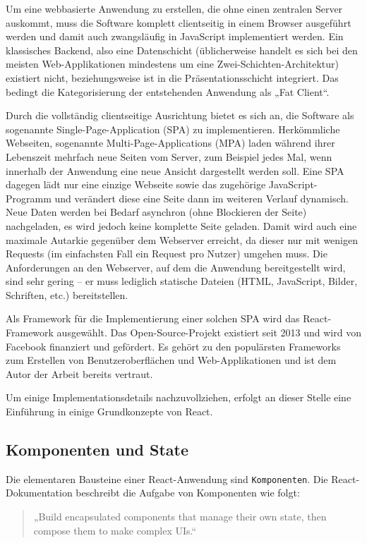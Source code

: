 Um eine webbasierte Anwendung zu erstellen, die ohne einen zentralen Server auskommt, muss die Software komplett clientseitig in einem Browser ausgeführt werden und damit auch zwangsläufig in JavaScript implementiert werden. Ein klassisches Backend, also eine Datenschicht (üblicherweise handelt es sich bei den meisten Web-Applikationen mindestens um eine Zwei-Schichten-Architektur) existiert nicht, beziehungsweise ist in die Präsentationsschicht integriert. Das bedingt die Kategorisierung der entstehenden Anwendung als „Fat Client“.

Durch die vollständig clientseitige Ausrichtung bietet es sich an, die Software als sogenannte Single-Page-Application (SPA) zu implementieren. Herkömmliche Webseiten, sogenannte Multi-Page-Applications (MPA) laden während ihrer Lebenszeit mehrfach neue Seiten vom Server, zum Beispiel jedes Mal, wenn innerhalb der Anwendung eine neue Ansicht dargestellt werden soll. Eine SPA dagegen lädt nur eine einzige Webseite sowie das zugehörige JavaScript-Programm und verändert diese eine Seite dann im weiteren Verlauf dynamisch. Neue Daten werden bei Bedarf asynchron (ohne Blockieren der Seite) nachgeladen, es wird jedoch keine komplette Seite geladen. Damit wird auch eine maximale Autarkie gegenüber dem Webserver erreicht, da dieser nur mit wenigen Requests (im einfachsten Fall ein Request pro Nutzer) umgehen muss. Die Anforderungen an den Webserver, auf dem die Anwendung bereitgestellt wird, sind sehr gering – er muss lediglich statische Dateien (HTML, JavaScript, Bilder, Schriften, etc.) bereitstellen.

Als Framework für die Implementierung einer solchen SPA wird das React-Framework\cite{web:react} ausgewählt. Das Open-Source-Projekt existiert seit 2013 und wird von Facebook finanziert und gefördert. Es gehört zu den populärsten Frameworks zum Erstellen von Benutzeroberflächen und Web-Applikationen\cite{web:stackoverflow_umfrage} und ist dem Autor der Arbeit bereits vertraut.

Um einige Implementationsdetails nachzuvollziehen, erfolgt an dieser Stelle eine  Einführung in einige Grundkonzepte von React.

\subsection{Komponenten und State}
Die elementaren Bausteine einer React-Anwendung sind \texttt{Komponenten}. Die React-Dokumentation beschreibt die Aufgabe von Komponenten wie folgt\cite{web:react}:
\begin{quotation}
„Build encapsulated components that manage their own state, then compose them to make complex UIs.“
\end{quotation}

